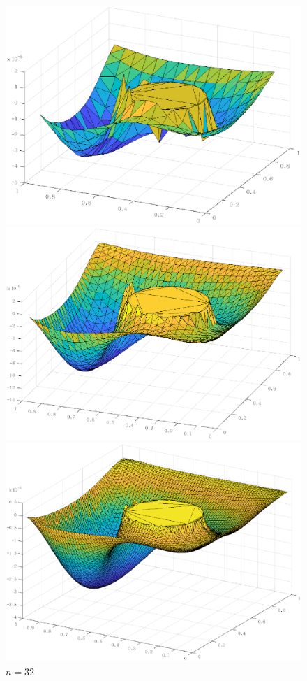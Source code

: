 \documentclass[lang=cn,11pt,a4paper]{elegantpaper}
\begin{document}
\begin{figure}[htbp]
  \centering
  \begin{minipage}[t]{0.24\linewidth}
      \centering
      \includegraphics[width=0.95\linewidth]{figure/error_problem1_D_ir_n=16.eps}
      \caption*{$n=16$}
  \end{minipage}
  \begin{minipage}[t]{0.24\linewidth}
    \centering
    \includegraphics[width=0.95\linewidth]{figure/error_problem1_D_ir_n=32.eps}
    \caption*{$n=32$}
  \end{minipage}
  \begin{minipage}[t]{0.24\linewidth}
    \centering
    \includegraphics[width=0.95\linewidth]{figure/error_problem1_D_ir_n=64.eps}

\end{minipage}
\end{figure}
\end{document}
